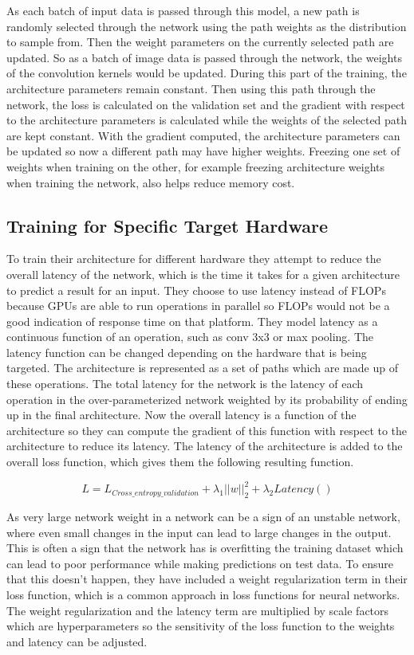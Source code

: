 \documentclass{ieee}
\begin{document}
As each batch of input data is passed through this model, a new path is randomly selected through the network using the path weights as the distribution to sample from. Then the weight parameters on the currently selected path are updated. So as a batch of image data is passed through the network, the weights of the convolution kernels would be updated. During this part of the training, the architecture parameters remain constant. Then using this path through the network, the loss is calculated on the validation set and the gradient with respect to the architecture parameters is calculated while the weights of the selected path are kept constant. With the gradient computed, the architecture parameters can be updated so now a different path may have higher weights. Freezing one set of weights when training on the other, for example freezing architecture weights when training the network, also helps reduce memory cost.

\subsection{Training for Specific Target Hardware}

To train their architecture for different hardware they attempt to reduce the overall latency of the network, which is the time it takes for a given architecture to predict a result for an input. They choose to use latency instead of FLOPs because GPUs are able to run operations in parallel so FLOPs would not be a good indication of response time on that platform. They model latency as a continuous function of an operation, such as conv 3x3 or max pooling. The latency function can be changed depending on the hardware that is being targeted. The architecture is represented as a set of paths which are made up of these operations. The total latency for the network is the latency of each operation in the over-parameterized network weighted by its probability of ending up in the final architecture. Now the overall latency is a function of the architecture so they can compute the gradient of this function with respect to the architecture to reduce its latency. The latency of the architecture is added to the overall loss function, which gives them the following resulting function. 

\begin{equation}
    L = L_{Cross\_entropy\_validation} + \lambda_1 ||w||_2^2 + \lambda_2Latency()
\end{equation}

As very large network weight in a network can be a sign of an unstable network, where even small changes in the input can lead to large changes in the output. This is often a sign that the network has is overfitting the training dataset which can lead to poor performance while making predictions on test data. To ensure that this doesn't happen, they have included a weight regularization term in their loss function, which is a common approach in loss functions for neural networks. The weight regularization and the latency term are multiplied by scale factors which are hyperparameters so the sensitivity of the loss function to the weights and latency can be adjusted.
\end{document}
